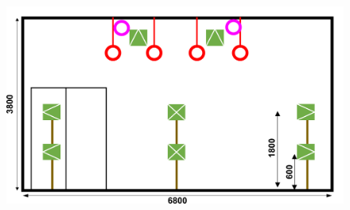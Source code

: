 \documentclass[11pt,a4j]{jreport}
\begin{document}

\newpage
{}
\begin{figure}[H]
  \begin{minipage}[b]{1\linewidth}
    \centering
    \includegraphics[width=.6\linewidth]{images/twoPiRoom/afcEquipArrayVertical.png}
    \label{fig:AFC機器配置断面図}
  \end{minipage}


\end{figure}
\end{document}
